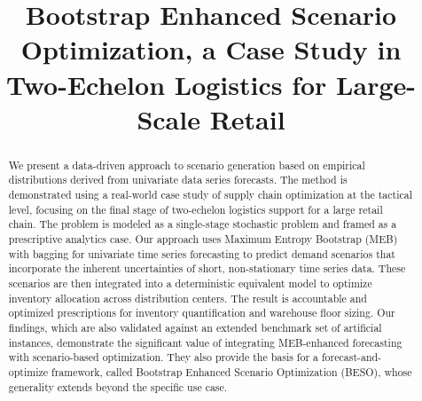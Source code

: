 \documentclass[preprint,11pt,authoryear]{elsarticle}
\begin{document}
\begin{frontmatter}

\title{Bootstrap Enhanced Scenario Optimization, a Case Study in Two-Echelon Logistics for Large-Scale Retail} %

%

\begin{abstract}
We present a data-driven approach to scenario generation based on empirical distributions derived from univariate data series forecasts. The method is demonstrated using a real-world case study of supply chain optimization at the tactical level, focusing on the final stage of two-echelon logistics support for a large retail chain. The problem is modeled as a single-stage stochastic problem and framed as a prescriptive analytics case.
Our approach uses Maximum Entropy Bootstrap (MEB) with bagging for univariate time series forecasting to predict demand scenarios that incorporate the inherent uncertainties of short, non-stationary time series data. These scenarios are then integrated into a deterministic equivalent model to optimize inventory allocation across distribution centers. The result is accountable and optimized prescriptions for inventory quantification and warehouse floor sizing.
Our findings, which are also validated against an extended benchmark set of artificial instances, demonstrate the significant value of integrating MEB-enhanced forecasting with scenario-based optimization. They also provide the basis for a forecast-and-optimize framework, called Bootstrap Enhanced Scenario Optimization (BESO), whose generality extends beyond the specific use case.
\end{abstract}



\end{frontmatter}
\end{document}
